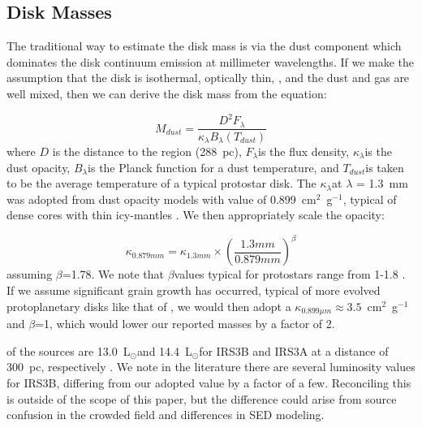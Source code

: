 \documentclass[twocolumn, 12pt]{aastex63}
\newcommand{\lsun}{L$_{\odot}$}
\begin{document}
\subsection{Disk Masses}\label{sec:diskmass}
The traditional way to estimate the disk mass is via the dust component which dominates the disk continuum emission at millimeter wavelengths. If we make the assumption that the disk is isothermal, optically thin, , and the dust and gas are well mixed, then we can derive the disk mass from the equation:

\begin{equation}\label{eq:dustmasseq}
    M_{dust} = \frac{D^2 F_{\lambda}}{\kappa_{\lambda}B_{\lambda}(T_{dust})}
\end{equation}
where $D$ is the distance to the region (288~pc), $F_{\lambda}$\space is the flux density, $\kappa_{\lambda}$\space is the dust opacity, $B_{\lambda}$\space is the Planck function for a dust temperature, and $T_{dust}$\space is taken to be the average temperature of a typical protostar disk. The $\kappa_{\lambda}$\space at $\lambda$ = 1.3~mm was adopted from dust opacity models with value of 0.899~cm$^2$~g$^{-1}$, typical of dense cores with thin icy-mantles \citep{1994AA...291..943O}. We then appropriately scale the opacity:

\begin{equation}
    \kappa_{0.879 mm} = \kappa_{1.3 mm}\times\left(\frac{1.3 mm}{0.879 mm}\right)^{\beta}
\end{equation}
assuming $\beta$=1.78. We note that $\beta$\space values typical for protostars range from 1-1.8 \citep{2009ApJ...696..841K, 2013PhDT.......434S}.  If we assume significant grain growth has occurred, typical of more evolved protoplanetary disks like that of \citet{2009ApJ...700.1502A}, we would then adopt a $\kappa_{0.899\mu m}\approx3.5$~cm$^{2}$~g$^{-1}$\space and $\beta$=1, which would lower our reported masses by a factor of 2.

 of the sources are  13.0~\lsun\space and 14.4~\lsun\space for IRS3B and IRS3A at a distance of 300~pc, respectively \citep[8.3~\lsun\space and 9.2~\lsun\space for IRS3B and IRS3A, respectively at 230~pc; ][]{2016ApJ...818...73T}. We note  in the literature there are several luminosity values for IRS3B, differing from our adopted value by a factor of a few. Reconciling this is outside of the scope of this paper, but the difference could arise from source confusion in the crowded field and differences in SED modeling.
\end{document}
